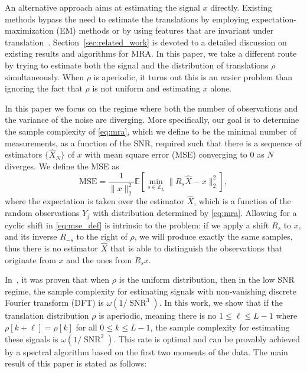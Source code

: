 \documentclass{IEEEtran}
\numberwithin{equation}{section}
\numberwithin{figure}{section}
\theoremstyle{plain}
\theoremstyle{definition}
\theoremstyle{remark}
\theoremstyle{plain}
\theoremstyle{remark}
\theoremstyle{plain}
\theoremstyle{plain}
\theoremstyle{remark}
\newcommand{\E}{\mathbb{E}}
\newcommand{\SNR}{\operatorname{SNR}}
\newcommand{\MSE}{\mathrm{MSE}}
\begin{document}
An alternative approach aims at estimating the signal $x$ directly. Existing methods bypass the need to estimate the translations by employing expectation-maximization (EM) methods or by using features that are invariant under translation~\cite{bendory2017bispectrum}. Section~\ref{sec:related_work} is devoted to a detailed discussion on existing results and algorithms for MRA. In this paper, we take a different route by trying to estimate both the signal and the distribution of translations $\rho$ simultaneously. When $\rho$ is aperiodic, it turns out this is an easier problem than ignoring the fact that $\rho$ is not uniform and estimating $x$ alone.

In this paper we focus on the regime where both the number of observations and the variance of the noise are diverging. More specifically, our goal is to determine the sample complexity of \eqref{eq:mra}, which we define to be the minimal number of measurements, as a function of the SNR, required such that there is a sequence of estimators $\{\hat X_N\}$ of $x$ with mean square error (MSE) converging to $0$ as $N$ diverges. We define the MSE as
\begin{equation} \label{eq:mse_def}
\MSE=\frac1{\|x\|_2^2}\E\left[\min_{s\in\mathbb{Z}_L}\|R_s\widehat X - x\|^2_2\right],
\end{equation}
where the expectation is taken over the estimator $\widehat X$, which is a function of the random observations $Y_j$ with distribution determined by \eqref{eq:mra}. Allowing for a cyclic shift in \eqref{eq:mse_def} is intrinsic to the problem: if we apply a shift $R_s$ to $x$, and its inverse $R_{-s}$ to the right of $\rho$, we will produce exactly the same samples, thus there is no estimator $\hat X$ that is able to distinguish the observations that originate from $x$ and the ones from $R_s x$.

In~\cite{bandeira2017optimal}, it was proven that when $\rho$ is the uniform distribution, then in the low SNR regime, the sample complexity for estimating signals with non-vanishing discrete Fourier transform (DFT) is $\omega(1/\SNR^3)$. In this work, we show that if the translation distribution $\rho$ is aperiodic, meaning there is no $1 \le \ell \le L-1$ where $\rho[k+\ell] = \rho[k]$ for all $0 \le k \le L-1$, the sample complexity for estimating these signals is $\omega(1/\SNR^2)$. This rate is optimal and can be provably achieved by a spectral algorithm based on the first two moments of the data. The main result of this paper is stated as follows:
\end{document}

